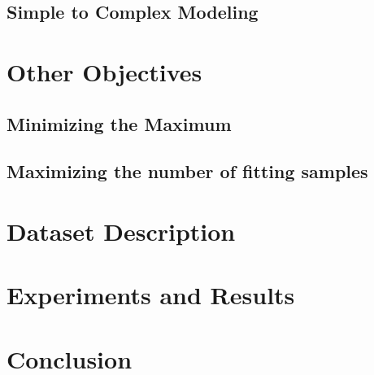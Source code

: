 \documentclass[useAMS,usenatbib,fleqn]{mn2e}
\begin{document}
\subsection{Simple to Complex Modeling}

\section{Other Objectives}
\label{sec-other-objectives}

\subsection{Minimizing the Maximum}
\subsection{Maximizing the number of fitting samples}

\section{Dataset Description}
\label{sec-dataset}

\section{Experiments and Results}
\label{sec-experiment}

\section{Conclusion}
\label{sec-conclusion}

\footnotesize{

	
}
\end{document}
